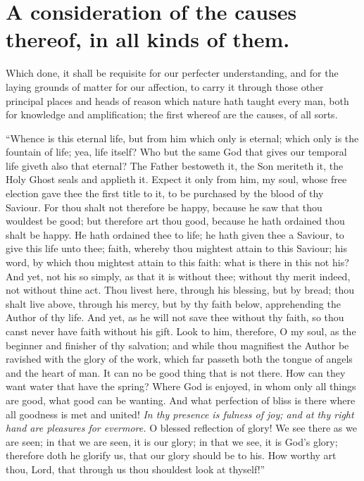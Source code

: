 \section{A consideration of the causes thereof, in all kinds of them.}
Which done, it shall be requisite for our perfecter understanding, and for the laying grounds of matter for our affection, to carry it through those other principal places and heads of reason which nature hath taught every man, both for knowledge and amplification; the first whereof are the causes, of all sorts. 

``Whence is this eternal life, but from him which only is eternal; which only is the fountain of life; yea, life itself? Who but the same God that gives our temporal life giveth also that eternal? The Father bestoweth it, the Son meriteth it, the Holy Ghost seals and applieth it. Expect it only from him, my soul, whose free election gave thee the first title to it, to be purchased by the blood of thy Saviour. For thou shalt not therefore be happy, because he saw that thou wouldest be good; but therefore art thou good, because he hath ordained thou shalt be happy. He hath ordained thee to life; he hath given thee a Saviour, to give this life unto thee; faith, whereby thou mightest attain to this Saviour; his word, by which thou mightest attain to this faith: what is there in this not his? And yet, not his so simply, as that it is without thee; without thy merit indeed, not without thine act. Thou livest here, through his blessing, but by bread; thou shalt live above, through his mercy, but by thy faith below, apprehending the Author of thy life. And yet, as he will not save thee without thy faith, so thou canst never have faith without his gift. Look to him, therefore, O my soul, as the beginner and finisher of thy salvation; and while thou magnifiest the Author be ravished with the glory of the work, which far passeth both the tongue of angels and the heart of man. It can no be good thing that is not there. How can they want water that have the spring? Where God is enjoyed, in whom only all things are good, what good can be wanting. And what perfection of bliss is there where all goodness is met and united! \emph{In thy presence is fulness of joy; and at thy right hand are pleasures for evermore.} O blessed reflection of glory! We see there as we are seen; in that we are seen, it is our glory; in that we see, it is God's glory; therefore doth he glorify us, that our glory should be to his. How worthy art thou, Lord, that through us thou shouldest look at thyself!''

